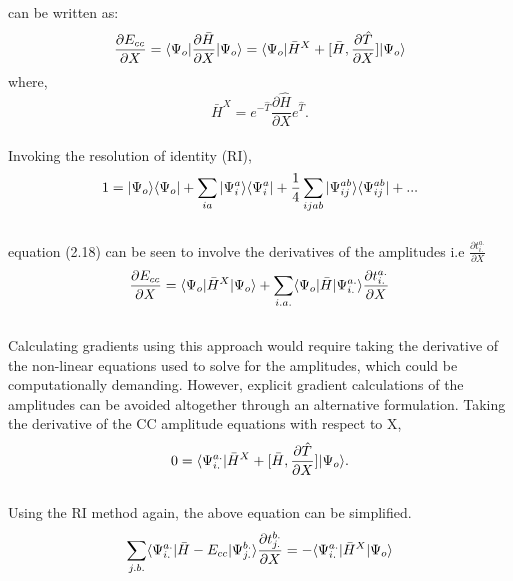 can be written as:
\\
\begin{equation}
\frac{\partial{E_{cc}}}{\partial X} = \langle \Psi_o |\frac{\partial{\bar H}}{\partial X}| \Psi_o \rangle = \langle \Psi_o |{\bar{H}}^X + \lbrack\bar H , \frac{\partial{\hat T}}{\partial X}\rbrack| \Psi_o \rangle 
\end{equation}
where, 
\begin{equation}
{\bar{H}}^X =  e^{-\hat{T}}\frac{\partial{\hat H}}{\partial X}e^{\hat{T}}.
\end{equation}
\\
Invoking the resolution of identity (RI),
\\
\begin{equation}
 1 = | \Psi_o \rangle\langle \Psi_o | + \sum_{ia}| {\Psi}^a_i \rangle\langle {\Psi}^a_i | + \frac{1}{4}\sum_{ijab}| {\Psi}^{ab}_{ij} \rangle\langle {\Psi}^{ab}_{ij} | + ...
\end{equation}
\\
equation (2.18) can be seen to involve the derivatives of the amplitudes i.e $\frac{\partial{t^{a.}_{i.}}}{\partial X}$
\\
\begin{equation}
\frac{\partial{E_{cc}}}{\partial X} = \langle \Psi_o |{\bar{H}}^X| \Psi_o \rangle + \sum_{i.a.}\langle \Psi_o |\bar{H}| {\Psi}^{a.}_{i.} \rangle \frac{\partial{t^{a.}_{i.}}}{\partial X}
\end{equation}
\\
Calculating gradients using this approach would require taking the derivative of the non-linear equations
used to solve for the amplitudes, which could be computationally demanding. However, explicit gradient 
calculations of the amplitudes can be avoided altogether through an alternative formulation.
Taking the derivative of the CC amplitude equations with respect to X, 
\\
\begin{equation} 
0 = \langle {\Psi}^{a.}_{i.} |{\bar{H}}^X + \lbrack\bar H , \frac{\partial{\hat T}}{\partial
X}\rbrack| \Psi_o \rangle.
\end{equation} 
\\
Using the RI method again, the above equation can be simplified.
\\
\begin{equation}
\sum_{j.b.}\langle {\Psi}^{a.}_{i.} |\bar{H}-E_{cc}| {\Psi}^{b.}_{j.} \rangle \frac{\partial{t^{b.}_{j.}}}{\partial X}
= - \langle {\Psi}^{a.}_{i.} |{\bar{H}}^X| \Psi_o \rangle
\end{equation}
